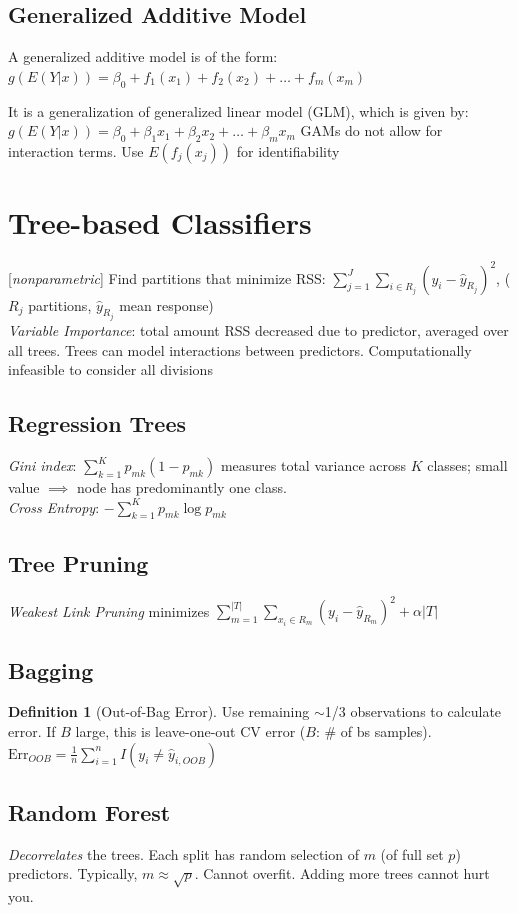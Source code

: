\documentclass[9pt]{article}
\theoremstyle{definition}
\newtheorem{definition}{Definition}[section]
\begin{document}
\begin{multicols}{2}
\subsection{Generalized Additive Model}
A generalized additive model is of the form: $g(E(Y|x)) = \beta_0 + f_1(x_1) + f_2(x_2) + \dots + f_m(x_m)$

It is a generalization of generalized linear model (GLM), which is given by: $g(E(Y|x)) = \beta_0 + \beta_1x_1 + \beta_2x_2 + \dots + \beta_mx_m$
GAMs do not allow for interaction terms.  Use $E(f_j(x_j))$ for identifiability
\section{Tree-based Classifiers}
[\textit{nonparametric}] Find partitions that minimize RSS: $\sum_{j=1}^J \sum_{i\in R_j} (y_i-\hat y_{R_j})^2$, ($R_j$ partitions, $\hat y_{R_j}$ mean response) \\
\textit{Variable Importance}: total amount RSS decreased due to predictor, averaged over all trees.  Trees can model interactions between predictors.  Computationally infeasible to consider all divisions
\subsection{Regression Trees}
\textit{Gini index}: $\sum_{k=1}^Kp_{mk}(1-p_{mk})$ measures total variance across $K$ classes; small value $\implies$ node has predominantly one class. \\\textit{Cross Entropy}: $-\sum_{k=1}^Kp_{mk}\log p_{mk}$
\subsection{Tree Pruning}
\textit{Weakest Link Pruning} minimizes $\sum_{m=1}^{|T|} \sum_{x_i\in R_m} (y_i-\hat y_{R_m})^2 + \alpha\vert T\vert$
\subsection{Bagging}
\begin{definition}[Out-of-Bag Error]
    Use remaining $\sim$1/3 observations to calculate error. If $B$ large, this is leave-one-out CV error ($B$: \# of bs samples). $\text{Err}_{OOB}=\frac{1}{n}\sum^n_{i=1}I(y_i\neq\hat y_{i,OOB})$
\end{definition}
\subsection{Random Forest}
\textit{Decorrelates} the trees. Each split has random selection of $m$ (of full set $p$) predictors. Typically, $m\approx\sqrt{p}$. Cannot overfit.  Adding more trees cannot hurt you.

\end{multicols}
\end{document}
